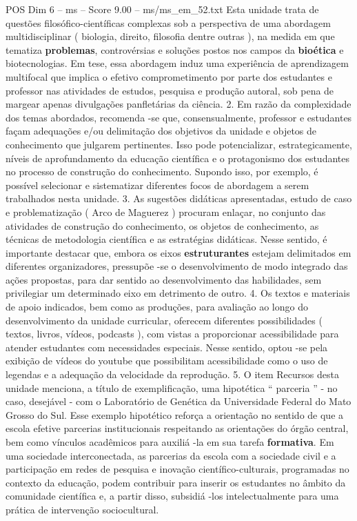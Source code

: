 \begin{textsample}{POS Dim 6 – ms – Score 9.00 – ms/ms\_em\_52.txt}
Esta unidade trata de questões filosófico-científicas complexas sob a perspectiva de uma abordagem multidisciplinar ( biologia, direito, filosofia dentre outras ), na medida em que tematiza \textbf{problemas}, controvérsias e soluções postos nos campos da \textbf{bioética} e biotecnologias.
Em tese, essa abordagem induz uma experiência de aprendizagem multifocal que implica o efetivo comprometimento por parte dos estudantes e professor nas atividades de estudos, pesquisa e produção autoral, sob pena de margear apenas divulgações panfletárias da ciência. 2.
Em razão da complexidade dos temas abordados, recomenda -se que, consensualmente, professor e estudantes façam adequações e/ou delimitação dos objetivos da unidade e objetos de conhecimento que julgarem pertinentes.
Isso pode potencializar, estrategicamente, níveis de aprofundamento da educação científica e o protagonismo dos estudantes no processo de construção do conhecimento.
Supondo isso, por exemplo, é possível selecionar e sistematizar diferentes focos de abordagem a serem trabalhados nesta unidade. 3.
As sugestões didáticas apresentadas, estudo de caso e problematização ( Arco de Maguerez ) procuram enlaçar, no conjunto das atividades de construção do conhecimento, os objetos de conhecimento, as técnicas de metodologia científica e as estratégias didáticas.
Nesse sentido, é importante destacar que, embora os eixos \textbf{estruturantes} estejam delimitados em diferentes organizadores, pressupõe -se o desenvolvimento de modo integrado das ações propostas, para dar sentido ao desenvolvimento das habilidades, sem privilegiar um determinado eixo em detrimento de outro. 4.
Os textos e materiais de apoio indicados, bem como as produções, para avaliação ao longo do desenvolvimento da unidade curricular, oferecem diferentes possibilidades ( textos, livros, vídeos, podcasts ), com vistas a proporcionar acessibilidade para atender estudantes com necessidades especiais.
Nesse sentido, optou -se pela exibição de vídeos do youtube que possibilitam acessibilidade como o uso de legendas e a adequação da velocidade da reprodução. 5.
O item Recursos desta unidade menciona, a título de exemplificação, uma hipotética “ parceria ” - no caso, desejável - com o Laboratório de Genética da Universidade Federal do Mato Grosso do Sul.
Esse exemplo hipotético reforça a orientação no sentido de que a escola efetive parcerias institucionais respeitando as orientações do órgão central, bem como vínculos acadêmicos para auxiliá -la em sua tarefa \textbf{formativa}.
Em uma sociedade interconectada, as parcerias da escola com a sociedade civil e a participação em redes de pesquisa e inovação científico-culturais, programadas no contexto da educação, podem contribuir para inserir os estudantes no âmbito da comunidade científica e, a partir disso, subsidiá -los intelectualmente para uma prática de intervenção sociocultural.

\end{textsample}
